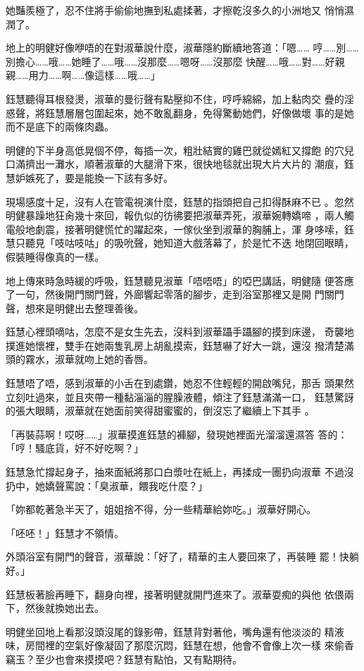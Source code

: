 她豔羨極了，忍不住將手偷偷地撫到私處揉著，才擦乾沒多久的小洲地又
悄悄濕潤了。

地上的明健好像咿唔的在對淑華說什麼，淑華隱約斷續地答道：「嗯……
哼……別……別擔心……哦……她睡了……哦……沒那麼……嗯呀……沒那麼
快醒……哦……對……好親親……用力……啊……像這樣……哦……」

鈺慧聽得耳根發燙，淑華的曼衍聲有點壓抑不住，哼呼綿綿，加上黏肉交
疊的淫惑聲，將鈺慧層層包圍起來，她不敢亂翻身，免得驚動她們，好像做壞
事的是她而不是底下的兩條肉蟲。

明健的下半身高低晃個不停，每插一次，粗壯結實的雞巴就從嫣紅又撐飽
的穴兒口滿擠出一灘水，順著淑華的大腿滑下來，很快地毯就出現大片大片的
潮痕，鈺慧妒嫉死了，要是能換一下該有多好。

現場感度十足，沒有人在管電視演什麼，鈺慧的指頭把自己扣得酥麻不已
。忽然明健暴躁地狂肏幾十來回，報仇似的彷彿要把淑華弄死，淑華婉轉嬌啼
，兩人觸電般地劇震，接著明健慌忙的躍起來，一傢伙坐到淑華的胸脯上，渾
身哆嗦，鈺慧只聽見「吱咕吱咕」的吸吮聲，她知道大戲落幕了，於是忙不迭
地閉回眼睛，假裝睡得像真的一樣。

地上傳來時急時緩的呼吸，鈺慧聽見淑華「唔唔唔」的啞巴講話，明健隨
便答應了一句，然後開門關門聲，外廊響起零落的腳步，走到浴室那裡又是開
門關門聲，想來是明健出去整理善後。

鈺慧心裡頭嘀咕，怎麼不是女生先去，沒料到淑華躡手躡腳的摸到床邊，
奇襲地撲進她懷裡，雙手在她兩隻乳房上胡亂摸索，鈺慧嚇了好大一跳，還沒
撥清楚滿頭的霧水，淑華就吻上她的香唇。

鈺慧唔了唔，感到淑華的小舌在到處鑽，她忍不住輕輕的開啟嘴兒，那舌
頭果然立刻吐過來，並且夾帶一種黏淄淄的腥臊液體，傾注了鈺慧滿滿一口，
鈺慧驚訝的張大眼睛，淑華就在她面前笑得甜蜜蜜的，倒沒忘了繼續上下其手
。

「再裝蒜啊！哎呀……」淑華摸進鈺慧的褲腳，發現她裡面光溜溜還濕答
答的：「哼！騷底貨，好不好吃啊？」

鈺慧急忙撐起身子，抽來面紙將那口白漿吐在紙上，再揉成一團扔向淑華
不過沒扔中，她嬌聲罵說：「臭淑華，餵我吃什麼？」

「妳都乾著急半天了，姐姐捨不得，分一些精華給妳吃。」淑華好開心。

「呸呸！」鈺慧才不領情。

外頭浴室有開門的聲音，淑華說：「好了，精華的主人要回來了，再裝睡
罷！快躺好。」

鈺慧板著臉再睡下，翻身向裡，接著明健就開門進來了。淑華耍痴的與他
依偎兩下，然後就換她出去。

明健坐回地上看那沒頭沒尾的錄影帶，鈺慧背對著他，嘴角還有他淡淡的
精液味，房間裡的空氣好像凝固了那麼沉悶，鈺慧在想，他會不會像上次一樣
來偷香竊玉？至少也會來摸摸吧？鈺慧有點怕，又有點期待。

